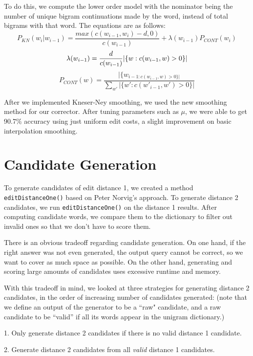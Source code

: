 \documentclass[10pt,twocolumn]{article}
\begin{document}
To do this, we compute the lower order model with the nominator being the number of unique bigram continuations made by the word, instead of total bigrams with that word. The equations are as follows:
\begin{equation*}
P_{KN}(w_i|w_{i-1})=\frac{max(c(w_{i-1},w_i)-d,0)}{c(w_{i-1})}+\lambda(w_{i-1})P_{CONT}(w_i)
\end{equation*}
\begin{equation*}
\lambda(w_{i-1}) = \frac{d}{c(w_{i-1})}|\{w:c(w_{i-1},w)>0\}|\\
\end{equation*}
\begin{equation*}
P_{CONT}(w) = \frac{|\{w_{i-1:c(w_{i-1},w)>0\}|}}{\sum_{w'}|\{w':c(w'_{i-1},w')>0\}|}
\end{equation*}

After we implemented Kneser-Ney smoothing, we used the new smoothing method for our corrector. After tuning parameters such as $\mu$, we were able to get 90.7\% accuracy using just uniform edit costs, a slight improvement on basic interpolation smoothing. 
\section{Candidate Generation}
To generate candidates of edit distance 1, we created a method \texttt{editDistanceOne()} based on Peter Norvig's approach. To generate distance 2 candidates, we run \texttt{editDistanceOne()} on the distance 1 results. After computing candidate words, we compare them to the dictionary to filter out invalid ones so that we don't have to score them.
 
There is an obvious tradeoff regarding candidate generation. On one hand, if the right answer was not even generated, the output query cannot be correct, so we want to cover as much space as possible. On the other hand, generating and scoring large amounts of candidates uses excessive runtime and memory.

With this tradeoff in mind, we looked at three strategies for generating distance 2 candidates, in the order of increasing number of candidates generated: (note that we define an output of the generator to be a ``raw" candidate, and a raw candidate to be ``valid'' if all its words appear in the unigram dictionary.)

1. Only generate distance 2 candidates if there is no valid distance 1 candidate.

2. Generate distance 2 candidates from all {\it valid} distance 1 candidates.
\end{document}
